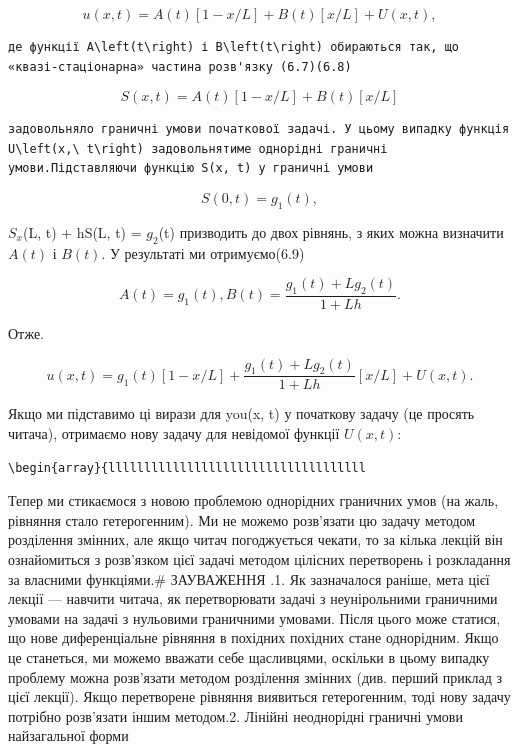 \documentclass[
  ukrainian,
]{article}
\begin{document}
\[
u(x, t) = A(t)[1-x/L] + B(t)[x/L] + U(x, t),
\]

\begin{verbatim}
де функції A\left(t\right) і B\left(t\right) обираються так, що «квазі-стаціонарна» частина розв'язку (6.7)(6.8)
\end{verbatim}

\[
S(x, t) = A(t)[1 - x/L] + B(t)[x/L]
\]

\begin{verbatim}
задовольняло граничні умови початкової задачі. У цьому випадку функція U\left(x,\ t\right) задовольнятиме однорідні граничні умови.Підставляючи функцію S(x, t) у граничні умови
\end{verbatim}

\[
S(0, t) = g_1(t),
\]

\(S_x\)(L, t) + hS(L, t) = \(g_2\)(t) призводить до двох рівнянь, з яких
можна визначити \(A(t)\) і \(B(t)\). У результаті ми отримуємо(6.9)

\[
A(t) = g_1(t), B(t) = \frac{g_1(t) + Lg_2(t)}{1 + Lh}.
\]

Отже.

\[
u(x, t) = g_1(t) [1 - x/L] + \frac{g_1(t) + Lg_2(t)}{1 + Lh} [x/L] + U(x, t).
\]

Якщо ми підставимо ці вирази для you(x, t) у початкову задачу (це
просять читача), отримаємо нову задачу для невідомої функції
\(U(x, t)\):

\begin{verbatim}
\begin{array}{llllllllllllllllllllllllllllllllllll
\end{verbatim}

Тепер ми стикаємося з новою проблемою однорідних граничних умов (на
жаль, рівняння стало гетерогенним). Ми не можемо розв'язати цю задачу
методом розділення змінних, але якщо читач погоджується чекати, то за
кілька лекцій він ознайомиться з розв'язком цієї задачі методом цілісних
перетворень і розкладання за власними функціями.\# ЗАУВАЖЕННЯ .1. Як
зазначалося раніше, мета цієї лекції --- навчити читача, як
перетворювати задачі з неунірольними граничними умовами на задачі з
нульовими граничними умовами. Після цього може статися, що нове
диференціальне рівняння в похідних похідних стане однорідним. Якщо це
станеться, ми можемо вважати себе щасливцями, оскільки в цьому випадку
проблему можна розв'язати методом розділення змінних (див. перший
приклад з цієї лекції). Якщо перетворене рівняння виявиться
гетерогенним, тоді нову задачу потрібно розв'язати іншим методом.2.
Лінійні неоднорідні граничні умови найзагальної форми
\end{document}

